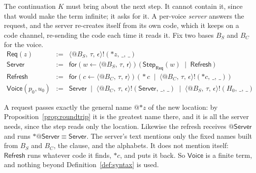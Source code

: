\documentclass[11pt,a4paper]{article}
\makeatletter
\theoremstyle{plain}
\theoremstyle{definition}
\theoremstyle{remark}
\newcommand{\scong}{\equiv}
\newcommand{\nm}[3]{\langle @#1,\,#2,\,#3\rangle}
\newcommand{\snd}[4]{#1!(#2,\,#3,\,#4)}
\newcommand{\rcv}[3]{\mathsf{for}(#1 \leftarrow #2)\,#3}
\newcommand{\Voice}{\mathsf{Voice}}
\newcommand{\drop}{{*}}
\newcommand{\Server}{\mathsf{Server}}
\newcommand{\Refresh}{\mathsf{Refresh}}
\newcommand{\Req}{\mathsf{Req}}
\newcommand{\nulld}{\epsilon}
\newcommand{\rest}{\mathsf{r}}
\newcommand{\wild}{\_}
\makeatother
\begin{document}
The continuation $K$ must bring about the next step. It cannot contain it,
since that would make the term infinite; it asks for it. A per-voice
\emph{server} answers the request, and the server re-creates itself from its
own code, which it keeps on a code channel, re-sending the code each time it
reads it. Fix two bases $B_S$ and $B_C$ for the voice.
\[
\begin{array}{rcl}
\Req(z) &:=& \snd{\nm{B_S}{\tau}{\nulld}}{\drop z}{\wild}{\wild} \\[4pt]
\Server &:=& \rcv{w}{\nm{B_S}{\tau}{\rest}}{\big(\,\mathsf{Step}_{\Req}(w) \;\mid\; \Refresh\,\big)} \\[4pt]
\Refresh &:=& \rcv{c}{\nm{B_C}{\tau}{\rest}}{\big(\,\drop c \;\mid\; \snd{\nm{B_C}{\tau}{\nulld}}{\drop c}{\wild}{\wild}\,\big)} \\[6pt]
\Voice(p_0,u_0) &:=& \Server \;\mid\; \snd{\nm{B_C}{\tau}{\nulld}}{\Server}{\wild}{\wild}
  \;\mid\; \snd{\nm{B_S}{\tau}{\nulld}}{H_0}{\wild}{\wild}
\end{array}
\]

\noindent A request passes exactly the general name $@{\drop z}$ of the new
location: by Proposition~\ref{prop:roundtrip} it is the greatest name there, and
it is all the server needs, since the step reads only the location. Likewise the
refresh receives $@\Server$ and runs $\drop @\Server \scong \Server$. The
server's text mentions only the fixed names built from $B_S$ and $B_C$, the
clause, and the alphabets. It does not mention itself: $\Refresh$
runs whatever code it finds, $\drop c$, and puts it back. So $\Voice$ is a finite
term, and nothing beyond Definition~\ref{def:syntax} is used.
\end{document}
